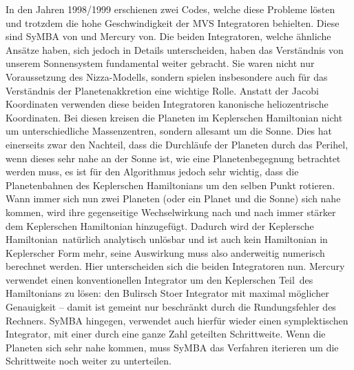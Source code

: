 \documentclass[12pt,a4paper,twoside]{article}
\begin{document}
In den Jahren 1998/1999 erschienen zwei Codes, welche diese Probleme lösten und trotzdem die hohe Geschwindigkeit der MVS Integratoren behielten. Diese sind SyMBA von \cite{Duncan1998} und Mercury von\cite{Chambers1999}. Die beiden Integratoren, welche ähnliche Ansätze haben, sich jedoch in Details unterscheiden, haben das Verständnis von unserem Sonnensystem fundamental weiter gebracht. Sie waren nicht nur Voraussetzung des Nizza-Modells, sondern spielen insbesondere auch für das Verständnis der Planetenakkretion eine wichtige Rolle\cite{Morbidelli2002}.
Anstatt der Jacobi Koordinaten verwenden diese beiden Integratoren kanonische heliozentrische Koordinaten. Bei diesen kreisen die Planeten im Keplerschen Hamiltonian nicht um unterschiedliche Massenzentren, sondern allesamt um die Sonne. Dies hat einerseits zwar den Nachteil, dass die Durchläufe der Planeten durch das Perihel, wenn dieses sehr nahe an der Sonne ist, wie eine Planetenbegegnung betrachtet werden muss, es ist für den Algorithmus jedoch sehr wichtig, dass die Planetenbahnen des Keplerschen Hamiltonians um den selben Punkt rotieren\cite{Morbidelli2002}.
Wann immer sich nun zwei Planeten (oder ein Planet und die Sonne) sich nahe kommen, wird ihre gegenseitige Wechselwirkung nach und nach immer stärker dem Keplerschen Hamiltonian hinzugefügt\cite{Morbidelli2002}.
Dadurch wird der \glqq Keplersche Hamiltonian\grqq\  natürlich analytisch unlösbar und ist auch kein Hamiltonian in Keplerscher Form mehr, seine Auswirkung muss also anderweitig numerisch berechnet werden.
Hier unterscheiden sich die beiden Integratoren nun. Mercury verwendet einen konventionellen Integrator um den \glqq Keplerschen Teil\grqq\  des Hamiltonians zu lösen: den Bulirsch Stoer Integrator mit maximal möglicher Genauigkeit – damit ist gemeint nur beschränkt durch die Rundungsfehler des Rechners\cite{Chambers1999,Morbidelli2002}.
SyMBA hingegen, verwendet auch hierfür wieder einen symplektischen Integrator, mit einer durch eine ganze Zahl geteilten Schrittweite. Wenn die Planeten sich sehr nahe kommen, muss SyMBA das Verfahren iterieren um die Schrittweite noch weiter zu unterteilen\cite{Duncan1998,Morbidelli2002}.

\FloatBarrier
\end{document}
